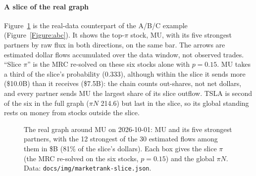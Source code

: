 \documentclass[preprint,3p,twocolumn]{elsarticle}
\begin{document}
\paragraph{A slice of the real graph} Figure~\ref{Figure:slice} is the real-data counterpart of the A/B/C example (Figure~\ref{Figure:abc}). It shows the top-$\pi$ stock, MU, with its five strongest partners by raw flux in both directions, on the same bar. The arrows are estimated dollar flows accumulated over the data window, not observed trades. ``Slice $\pi$'' is the MRC re-solved on these six stocks alone with $p=0.15$. MU takes a third of the slice's probability (0.333), although within the slice it sends more (\$10.0B) than it receives (\$7.5B): the chain counts out-shares, not net dollars, and every partner sends MU the largest share of its slice outflow. TSLA is second of the six in the full graph ($\pi N$ 214.6) but last in the slice, so its global standing rests on money from stocks outside the slice.

\begin{figure}[t]
\centering
{}
\caption{The real graph around MU on 2026-10-01: MU and its five strongest partners, with the 12 strongest of the 30 estimated flows among them in \$B (81\% of the slice's dollars). Each box gives the slice $\pi$ (the MRC re-solved on the six stocks, $p=0.15$) and the global $\pi N$. Data: \texttt{docs/img/marketrank-slice.json}.}
\label{Figure:slice}
\end{figure}
\end{document}
